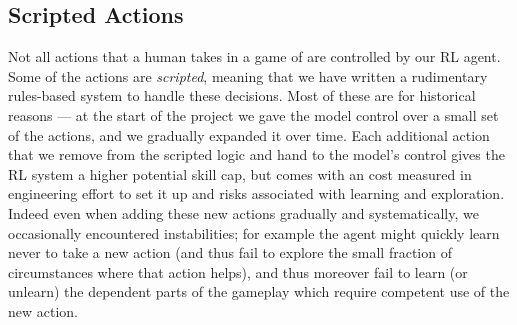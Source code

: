 \documentclass[ocean-paper.tex]{subfiles}
\begin{document}
\subsection{Scripted Actions}\label{sec:game:rep:scriptedac}
Not all actions that a human takes in a game of \dota are controlled by our RL agent. Some of the actions are {\it scripted}, meaning that we have written a rudimentary rules-based system to handle these decisions. 
Most of these are for historical reasons --- at the start of the project we gave the model control over a small set of the actions, and we gradually expanded it over time. 
Each additional action that we remove from the scripted logic and hand to the model's control gives the RL system a higher potential skill cap, but comes with an cost measured in engineering effort to set it up and risks associated with learning and exploration.
Indeed even when adding these new actions gradually and systematically, we occasionally encountered instabilities; for example the agent might quickly learn never to take a new action (and thus fail to explore the small fraction of circumstances where that action helps), and thus moreover fail to learn (or unlearn) the dependent parts of the gameplay which require competent use of the new action. 
\end{document}
